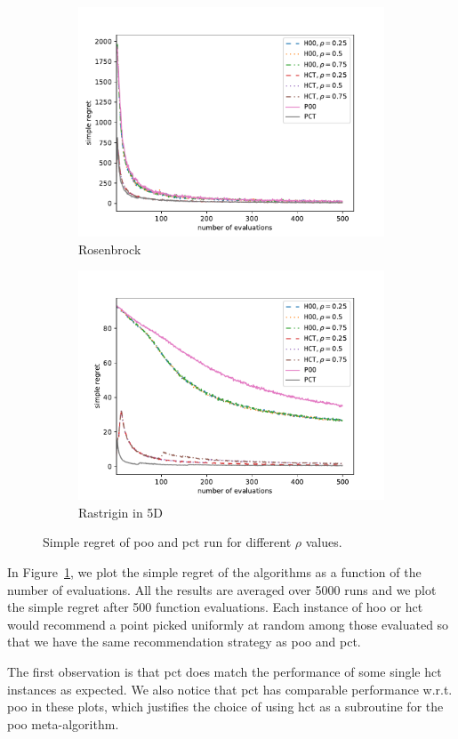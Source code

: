 \begin{figure}[ht]
\begin{subfigure}{0.33\textwidth}
    \centering\includegraphics[width=\textwidth]{Chapter5/img/rosenbrock_plot.pdf}
    \caption{Rosenbrock}
  \end{subfigure}
  \begin{subfigure}{0.33\textwidth}
    \centering\includegraphics[width=\textwidth]{Chapter5/img/rastrigin_plot.pdf}
    \caption{Rastrigin in 5D}
  \end{subfigure}
  \caption{Simple regret of \gls{poo} and \gls{pct} run for different $\rho$ values.}
  \label{fig:results}
\end{figure}

In Figure~\ref{fig:results}, we plot the simple regret of the algorithms as a function of the number of evaluations. All the results are averaged over 5000 runs and we plot the simple regret after 500 function evaluations. Each instance of \gls{hoo} or \gls{hct} would recommend a point picked uniformly at random among those evaluated so that we have the same recommendation strategy as \gls{poo} and \gls{pct}.

The first observation is that \gls{pct} does match the performance of some single \gls{hct} instances as expected. We also notice that \gls{pct} has comparable performance w.r.t.\,\gls{poo} in these plots, which justifies the choice of using \gls{hct} as a subroutine for the \gls{poo} meta-algorithm.
